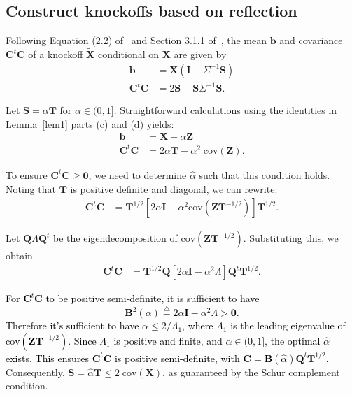 \documentclass[12pt,Times]{article}
\def\cite{\citep}
\def\tcb{\textcolor{black}}
\def\0{{\mathbf{0}}}
\def\T{{\mathbf{T}}}
\def\tX{{\mathbf{\tilde{X}}}}
\def\X{{\mathbf{X}}}
\def\C{{\mathbf{C}}}
\def\B{{\mathbf{B}}}
\def\b{{\mathbf{b}}}
\def\Z{{\mathbf{Z}}}
\def\Q{{\mathbf{Q}}}
\def\S{{\mathbf{S}}}
\def\I{{\mathbf{I}}}
\def\cov{{\textrm{cov}}}
\newcommand{\triangleq}{\stackrel{\scriptscriptstyle \triangle}{=}}
\begin{document}
\subsection{Construct knockoffs based on reflection}
Following Equation (2.2) of~\cite[][]{barber.candes.15} and Section 3.1.1 of~\cite[][]{candes.etal.18},  the mean $\b$ and covariance $\C^t\C$ of a knockoff $\tX$ conditional on $\X$ are given by   
\begin{equation}
\begin{aligned}
\b &= \X (\I - \Sigma^{-1} \S) \\
 \C^t \C &= 2\S - \S \Sigma^{-1} \S.
\end{aligned}
\end{equation}

Let $\S = \alpha \T$ for $\alpha\in(0,1]$. Straightforward calculations using the identities in Lemma~\ref{lem1} parts (c) and (d) yields: 
\begin{equation} \label{ctc}
\begin{aligned}
 \b  & = \X - \alpha \Z \\ 
\C^t \C    &=  2 \alpha \T - \alpha^2 \; \cov(\Z).                      
\end{aligned}
\end{equation}

To ensure $\C^t\C \ge \0$, we need to determine $\hat\alpha$ such that this condition holds. Noting that $\T$ is positive definite and diagonal, we can rewrite: 
\begin{equation} \label{ctc2}
\begin{aligned}
\C^t \C  &= \T^{1/2} \left[2\alpha \I - \alpha^2 \cov(\Z\T^{-1/2}) \right]\T^{1/2}.                       
\end{aligned}
\end{equation}

Let $\Q\Lambda\Q^t$ be the eigendecomposition of $\cov(\Z \T^{-1/2}).$ Substituting this, we obtain  
\begin{equation} \label{ctc3}
\begin{aligned}
\C^t \C    &= \T^{1/2} \Q \left[2\alpha \I - \alpha^2 \Lambda\right] \Q^t \T^{1/2}.                     
\end{aligned}
\end{equation}

\tcb{For $\C^t \C$ to be positive semi-definite, it is sufficient to have 
\begin{equation} \label{B2}
\B^2(\alpha) \triangleq 2\alpha\I  - \alpha^2  \Lambda  > \0. 
\end{equation}
Therefore it's sufficient to have $\alpha \le 2 / \Lambda_1$, where $\Lambda_1$ is the leading eigenvalue of $\cov(\Z \T^{-1/2})$.
Since $\Lambda_1$ is positive and finite, and $\alpha \in (0,1]$, the optimal $\hat\alpha$ exists. This ensures $\C^t \C$ is positive semi-definite,  with $\C = \B(\hat\alpha)\Q^t \T^{1/2}.$} Consequently,  $\S=\hat\alpha \T \le 2\;\cov(\X)$, as guaranteed by the Schur complement condition. 
\end{document}
